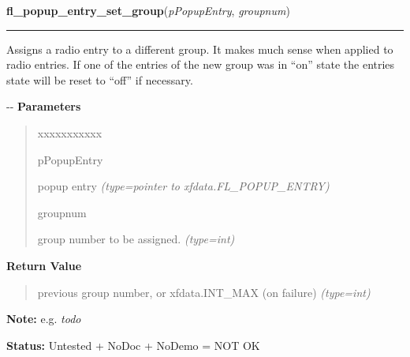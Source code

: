     \vspace{0.5ex}

\hspace{.8\funcindent}\begin{boxedminipage}{\funcwidth}

    \raggedright \textbf{fl\_popup\_entry\_set\_group}(\textit{pPopupEntry}, \textit{groupnum})

    \vspace{-1.5ex}

    \rule{\textwidth}{0.5\fboxrule}
\setlength{\parskip}{2ex}

Assigns a radio entry to a different group. It makes much sense when
applied to radio entries. If one of the entries of the new group was in
``on'' state the entries state will be reset to ``off'' if necessary.

-{}-
\setlength{\parskip}{1ex}
      \textbf{Parameters}
      \vspace{-1ex}

      \begin{quote}
        \begin{Ventry}{xxxxxxxxxxx}

          \item[pPopupEntry]


popup entry
            {\it (type=pointer to xfdata.FL\_POPUP\_ENTRY)}

          \item[groupnum]


group number to be assigned.
            {\it (type=int)}

        \end{Ventry}

      \end{quote}

      \textbf{Return Value}
    \vspace{-1ex}

      \begin{quote}

previous group number, or xfdata.INT\_MAX (on failure)
      {\it (type=int)}

      \end{quote}

\textbf{Note:} 
e.g. \emph{todo}


\textbf{Status:} 
Untested + NoDoc + NoDemo = NOT OK


    \end{boxedminipage}

    \label{xformslib:flpopup:fl_popup_entry_get_subpopup}

